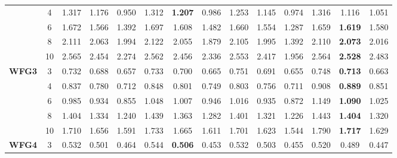\documentclass[onecolumn,10pt]{asme2ej}
\begin{document}
\begin{table}[!htb]
\begin{tabular}{|c|c|c|c|c|c|c|c|c|c|c|c|c|c|}
	& 4          & 1.317         & 1.176          & 0.950          & 1.312         & \textbf{1.207} & 0.986          & 1.253         & 1.145          & 0.974          & 1.316         & 1.116          & 1.051          \\ \cline{2-14} 
	& 6          & 1.672         & 1.566          & 1.392          & 1.697         & 1.608          & 1.482          & 1.660         & 1.554          & 1.287          & 1.659         & \textbf{1.619} & 1.580          \\ \cline{2-14} 
	& 8          & 2.111         & 2.063          & 1.994          & 2.122         & 2.055          & 1.879          & 2.105         & 1.995          & 1.392          & 2.110         & \textbf{2.073} & 2.016          \\ \cline{2-14} 
	& 10         & 2.565         & 2.454          & 2.274          & 2.562         & 2.456          & 2.336          & 2.553         & 2.417          & 1.956          & 2.564         & \textbf{2.528} & 2.483          \\ \hline
	\multirow{5}{*}{\textbf{WFG3}} & 3          & 0.732         & 0.688          & 0.657          & 0.733         & 0.700          & 0.665          & 0.751         & 0.691          & 0.655          & 0.748         & \textbf{0.713} & 0.663          \\ \cline{2-14} 
	& 4          & 0.837         & 0.780          & 0.712          & 0.848         & 0.801          & 0.749          & 0.803         & 0.756          & 0.711          & 0.908         & \textbf{0.889} & 0.851          \\ \cline{2-14} 
	& 6          & 0.985         & 0.934          & 0.855          & 1.048         & 1.007          & 0.946          & 1.016         & 0.935          & 0.872          & 1.149         & \textbf{1.090} & 1.025          \\ \cline{2-14} 
	& 8          & 1.404         & 1.334          & 1.240          & 1.439         & 1.363          & 1.282          & 1.401         & 1.321          & 1.226          & 1.443         & \textbf{1.404} & 1.320          \\ \cline{2-14} 
	& 10         & 1.710         & 1.656          & 1.591          & 1.733         & 1.665          & 1.611          & 1.701         & 1.623          & 1.544          & 1.790         & \textbf{1.717} & 1.629          \\ \hline
	\multirow{5}{*}{\textbf{WFG4}} & 3          & 0.532         & 0.501          & 0.464          & 0.544         & \textbf{0.506} & 0.453          & 0.532         & 0.503          & 0.455          & 0.520         & 0.489          & 0.447          \\ \cline{2-14} 

\end{tabular}
\end{table}
\end{document}
